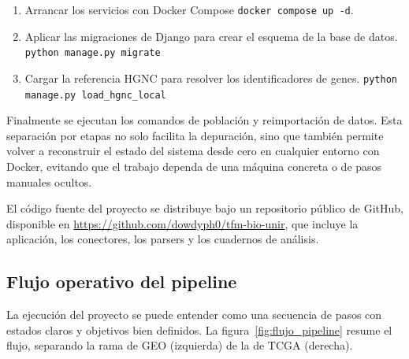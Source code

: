 \documentclass[12pt, a4paper]{report}
\begin{document}
\begin{enumerate}
  \item Arrancar los servicios con Docker Compose \texttt{docker compose up -d}.
  \item Aplicar las migraciones de Django para crear el esquema de la base de datos. \texttt{python manage.py migrate}
  \item Cargar la referencia HGNC para resolver los identificadores de genes.  \texttt{python manage.py load\_hgnc\_local}
\end{enumerate}

Finalmente se ejecutan los comandos de población y reimportación de datos. Esta separación por etapas no solo facilita la depuración, sino que también permite volver a reconstruir el estado del sistema desde cero en cualquier entorno con Docker, evitando que el trabajo dependa de una máquina concreta o de pasos manuales ocultos.

El código fuente del proyecto se distribuye bajo un repositorio público de GitHub, disponible en \url{https://github.com/dowdyph0/tfm-bio-unir}, que incluye la aplicación, los conectores, los parsers y los cuadernos de análisis.

\subsection{Flujo operativo del pipeline}

La ejecución del proyecto se puede entender como una secuencia de pasos con estados claros y objetivos bien definidos. La figura~\ref{fig:flujo_pipeline} resume el flujo, separando la rama de GEO (izquierda) de la de TCGA (derecha).
\end{document}
